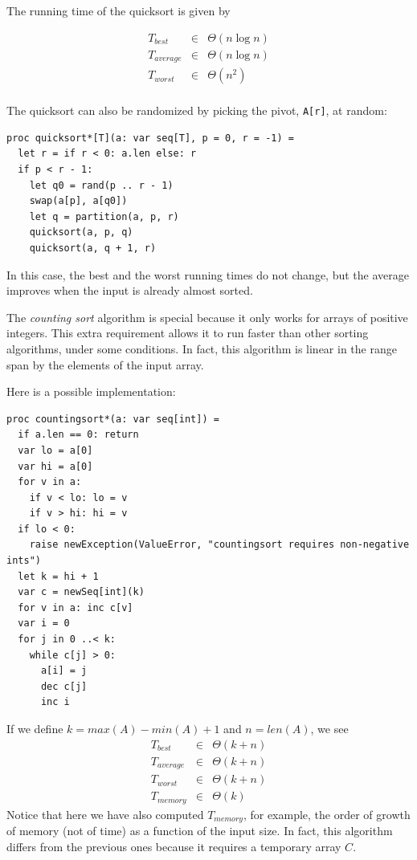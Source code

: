 \documentclass[justified, sixbynine]{tufte-book}
\def\ft{\small\tt}
\theoremstyle{plain}%
\newtheorem * {corollary}{Corollary}
\theoremstyle{definition}
\theoremstyle{remark}
\newtheorem * {remark}{Remark}
\newtheorem * {note}{Note}
\begin{document}
\begin{fullwidth}
The running time of the quicksort is given by

\begin{eqnarray}
T_{best} &\in &\Theta (n\log n) \\
T_{average} &\in &\Theta (n\log n) \\
T_{worst} &\in &\Theta (n^2) \\
\end{eqnarray}

The quicksort can also be randomized by picking the pivot, {\ft A[r]}, at random:
\begin{lstlisting}
proc quicksort*[T](a: var seq[T], p = 0, r = -1) =
  let r = if r < 0: a.len else: r
  if p < r - 1:
    let q0 = rand(p .. r - 1)
    swap(a[p], a[q0])
    let q = partition(a, p, r)
    quicksort(a, p, q)
    quicksort(a, q + 1, r)
\end{lstlisting}

In this case, the best and the worst running times do not change, but the average improves when the input is already almost sorted.


The {\it counting sort} algorithm is special because it only works for arrays of positive integers. This extra requirement allows it to run faster than other sorting algorithms, under some conditions. In fact, this algorithm is linear in the range span by the elements of the input array.

Here is a possible implementation:
\begin{lstlisting}
proc countingsort*(a: var seq[int]) =
  if a.len == 0: return
  var lo = a[0]
  var hi = a[0]
  for v in a:
    if v < lo: lo = v
    if v > hi: hi = v
  if lo < 0:
    raise newException(ValueError, "countingsort requires non-negative ints")
  let k = hi + 1
  var c = newSeq[int](k)
  for v in a: inc c[v]
  var i = 0
  for j in 0 ..< k:
    while c[j] > 0:
      a[i] = j
      dec c[j]
      inc i
\end{lstlisting}

If we define $k=max(A)-min(A)+1$ and $n=len(A)$, we see
\begin{eqnarray}
T_{best} &\in &\Theta (k+n) \\
T_{average} &\in &\Theta (k+n) \\
T_{worst} &\in &\Theta (k+n) \\
T_{memory} &\in &\Theta (k)
\end{eqnarray}
Notice that here we have also computed $T_{memory}$, for example, the order of growth of memory (not of time) as a function of the input size. In fact, this algorithm differs from the previous ones because it requires a temporary array $C$.


\end{fullwidth}
\end{document}
